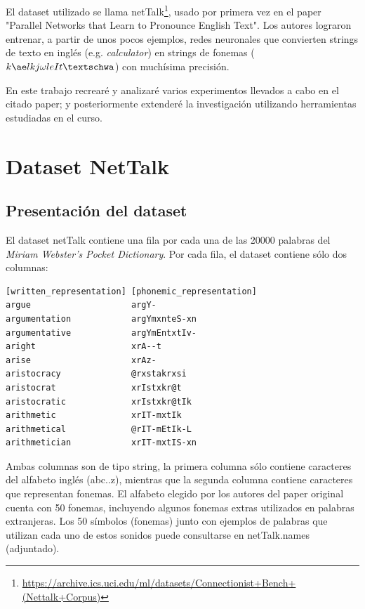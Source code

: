 \documentclass[paper=a4, fontsize=11pt]{scrartcl} %
\numberwithin{equation}{section} %
\numberwithin{figure}{section} %
\numberwithin{table}{section} %
\begin{document}
\par El dataset utilizado se llama netTalk\footnote{\url{https://archive.ics.uci.edu/ml/datasets/Connectionist+Bench+(Nettalk+Corpus)}}, usado por primera vez en el paper  "Parallel Networks that Learn to Pronounce English Text"\cite{parallel}. Los autores lograron entrenar, a partir de unos pocos ejemplos, redes neuronales que convierten strings de texto en inglés (e.g. \textit{calculator}) en strings de fonemas ( $k \ae lkj \omega leIt  \textschwa $) con muchísima precisión.\\
    

\par En este trabajo recrearé y analizaré varios experimentos llevados a cabo en el citado paper; y posteriormente extenderé la investigación utilizando herramientas estudiadas en el curso.

\section{Dataset NetTalk}

\subsection{Presentación del dataset}
El dataset netTalk contiene una fila por cada una de las 20000 palabras del \textit{Miriam Webster’s Pocket Dictionary}. Por cada fila, el dataset contiene sólo dos columnas: \\

\begin{center}

\begin{BVerbatim}
[written_representation] [phonemic_representation]
argue                    argY-   
argumentation            argYmxnteS-xn   
argumentative            argYmEntxtIv-   
aright                   xrA--t   
arise                    xrAz-   
aristocracy              @rxstakrxsi   
aristocrat               xrIstxkr@t   
aristocratic             xrIstxkr@tIk   
arithmetic               xrIT-mxtIk   
arithmetical             @rIT-mEtIk-L   
arithmetician            xrIT-mxtIS-xn   
\end{BVerbatim}

\end{center}

Ambas columnas son de tipo string, la primera columna sólo contiene caracteres del alfabeto inglés (abc..z), mientras que la segunda columna contiene caracteres que representan fonemas. El alfabeto elegido por los autores del paper original cuenta con 50 fonemas, incluyendo algunos fonemas extras utilizados en palabras extranjeras. Los 50 símbolos (fonemas) junto con ejemplos de palabras que utilizan cada uno de estos sonidos puede consultarse en netTalk.names (adjuntado).\\
\end{document}
